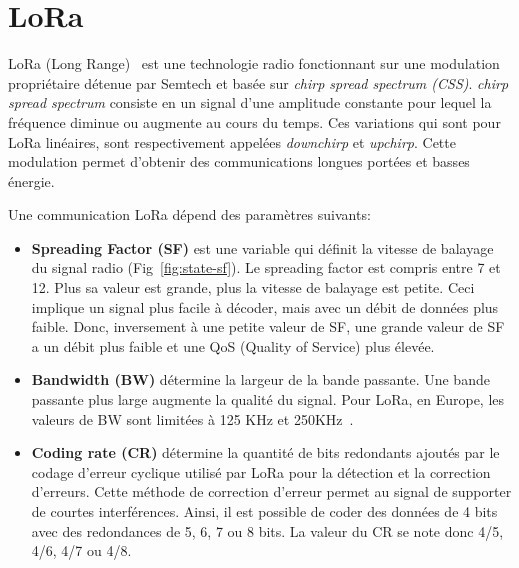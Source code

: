 \section{LoRa}\label{sec:etat_art-lora}
\renewcommand{\rightmark}{LoRa}

LoRa (Long Range)~\cite{sx1276:datasheet}\cite{paper:lora-reverse-engineering} est une technologie 
radio  fonctionnant sur une modulation propriétaire détenue par Semtech et basée sur \textit{chirp 
spread spectrum (CSS)}. \textit{chirp spread spectrum} consiste en un signal d'une amplitude 
constante pour lequel la fréquence diminue ou augmente au cours du temps. Ces variations qui sont 
pour LoRa linéaires, sont respectivement appelées \textit{downchirp} et \textit{upchirp}. Cette 
modulation permet d'obtenir des communications longues portées et basses énergie.

Une communication LoRa dépend des paramètres suivants:
\begin{itemize}
    \item \textbf{Spreading Factor (SF)} est une variable qui définit la vitesse de balayage du signal radio
    (Fig~\ref{fig:state-sf}). Le spreading factor est compris entre 7 et 12. Plus sa valeur est grande, plus la vitesse de balayage est petite. Ceci implique un signal plus facile à décoder, mais avec un débit de données plus faible. Donc, inversement à une petite valeur de SF, une grande valeur de SF a un débit plus faible et une QoS (Quality of Service) plus élevée.
    
    \item \textbf{Bandwidth (BW)} détermine la largeur de la bande passante. Une bande passante plus large augmente la qualité du signal. Pour LoRa, en Europe, les valeurs de BW sont limitées à 125 KHz et 250KHz~\cite{lora-frequencyplan}.
    
    \item \textbf{Coding rate (CR)} détermine la quantité de bits redondants ajoutés par le codage 
    d'erreur cyclique utilisé par LoRa pour la détection et la correction d'erreurs. Cette méthode 
    de correction d'erreur permet au signal de supporter de courtes interférences. Ainsi, il est
    possible de coder des données de 4 bits avec des redondances de 5, 6, 7 ou 8 bits. La valeur du 
    CR se note donc 4/5, 4/6, 4/7 ou 4/8.
    
\end{itemize}

